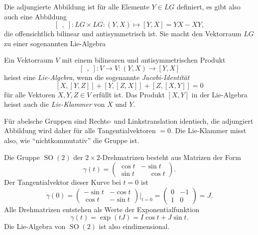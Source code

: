 Die adjungierte Abbildung ist für alle Elemente $Y\in LG$ definiert,
es gibt also auch eine Abbildung
\[
[\;\,,\;]
\colon
LG\times LG
:
(Y,X)
\mapsto
[Y,X] = YX-XY,
\]
die offensichtlich bilinear und antisymmetrisch ist.
Sie macht den Vektorraum $LG$ zu einer sogenannten Lie-Algebra

\begin{definition}
Ein Vektorraum $V$ mit einem bilinearen und antisymmetrischen
Produkt
\[
[\;\,,\;]
\colon
V\to V
:
(Y,X) \to [Y,X]
\]
heisst eine {\em Lie-Algebra}, wenn die sogenannte
{\em Jacobi-Identität}
\[
[X,[Y,Z]]
+
[Y,[Z,X]]
+
[Z,[X,Y]]
=
0
\]
für alle Vektoren $X,Y,Z\in V$
erfüllt ist.
Das Produkt $[X,Y]$ in der Lie-Algebra heisst auch die
{\em Lie-Klammer} von $X$ und $Y$.
\end{definition}

Für abelsche Gruppen sind Rechts- und Linkstranslation identisch,
die adjungiert Abbildung wird daher für alle Tangentialvektoren $=0$.
Die Lie-Klammer misst also, wie ``nichtkommutativ'' die Gruppe ist.

\begin{beispiel}
Die Gruppe $\operatorname{SO}(2)$ der $2\times 2$-Drehmatrizen
besteht aus Matrizen der Form
\[
\gamma(t)
=
\begin{pmatrix}
\cos t &          -  \sin t \\
\sin t & \phantom{-} \cos t
\end{pmatrix}.
\]
Der Tangentialvektor dieser Kurve bei $t=0$ ist
\[
\dot{\gamma}(0)
=
\begin{pmatrix}
-\sin t & -\cos t \\
 \cos t & -\sin t
\end{pmatrix}
\bigg|_{t=0}
=
\begin{pmatrix}
0&-1\\
1&0
\end{pmatrix}
=J.
\]
Alle Drehmatrizen entstehen als Werte der Exponentialfunktion
\[
\gamma(t)
=
\exp(tJ)
=
I \cos t + J \sin t.
\]
Die Lie-Algebra von $\operatorname{SO}(2)$ ist also eindimensional.
\end{beispiel}

